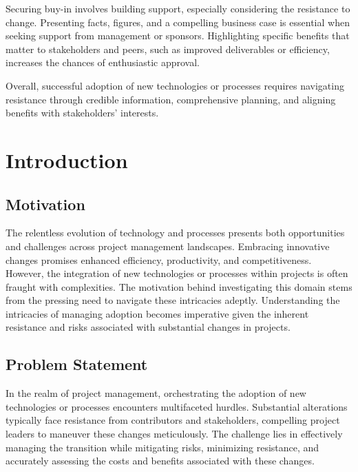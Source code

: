 \documentclass[11pt,letterpaper]{report}
\begin{document}
Securing buy-in involves building support, especially considering the resistance to change. Presenting facts, figures, and a compelling business case is essential when seeking support from management or sponsors. Highlighting specific benefits that matter to stakeholders and peers, such as improved deliverables or efficiency, increases the chances of enthusiastic approval.

Overall, successful adoption of new technologies or processes requires navigating resistance through credible information, comprehensive planning, and aligning benefits with stakeholders' interests.




\chapter{Introduction}

\section{Motivation}
The relentless evolution of technology and processes presents both opportunities and challenges across project management landscapes. Embracing innovative changes promises enhanced efficiency, productivity, and competitiveness. However, the integration of new technologies or processes within projects is often fraught with complexities. The motivation behind investigating this domain stems from the pressing need to navigate these intricacies adeptly. Understanding the intricacies of managing adoption becomes imperative given the inherent resistance and risks associated with substantial changes in projects.

\section{Problem Statement}
 In the realm of project management, orchestrating the adoption of new technologies or processes encounters multifaceted hurdles. Substantial alterations typically face resistance from contributors and stakeholders, compelling project leaders to maneuver these changes meticulously. The challenge lies in effectively managing the transition while mitigating risks, minimizing resistance, and accurately assessing the costs and benefits associated with these changes.
\end{document}
